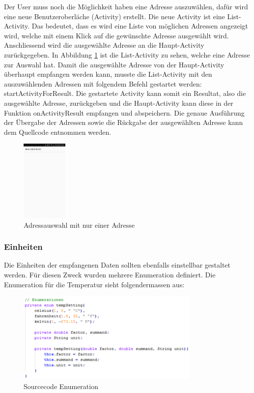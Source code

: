 Der User muss noch die Möglichkeit haben eine Adresse auszuwählen, dafür wird eine neue Benutzeroberläche (Activity) erstellt. Die neue Activity ist eine List-Activity. Das bedeutet, dass es wird eine Liste von möglichen Adressen angezeigt wird, welche mit einem Klick auf die gewünschte Adresse ausgewählt wird. Anschliessend wird die ausgewählte Adresse an die Haupt-Activity zurückgegeben. In Abbildung \ref{BLEadressauswahl} ist die List-Activity zu sehen, welche eine Adresse zur Auswahl hat. Damit die ausgewählte Adresse von der Haupt-Activity überhaupt empfangen werden kann, musste die List-Activity mit den auszuwählenden Adressen mit folgendem Befehl gestartet werden: startActivityForResult. Die gestartete Activity kann somit ein Resultat, also die ausgewählte Adresse, zurückgeben und die Haupt-Activity kann diese in der Funktion onActivityResult empfangen und abspeichern. Die genaue Ausführung der Übergabe der Adressen sowie die Rückgabe der ausgewählten Adresse kann dem Quellcode entnommen werden.

\begin{figure}[ht]
    \includegraphics[width=0.2\textwidth]{3Vorgehen/imag/BLEAdresseAuswaehlen.png}
    \caption{Adressauswahl mit nur einer Adresse}
	\label{BLEadressauswahl} 
\end{figure}



\subsubsection{Einheiten}

Die Einheiten der empfangenen Daten sollten ebenfalls einstellbar gestaltet werden. Für diesen Zweck wurden mehrere Enumeration definiert. Die Enumeration für die Temperatur sieht folgendermassen aus:

\begin{figure}[ht]
    \includegraphics[width=0.8\textwidth]{3Vorgehen/imag/app_tempSetting.png}
    \caption{Sourcecode Enumeration}
	\label{app_tempSetting} 
\end{figure}

